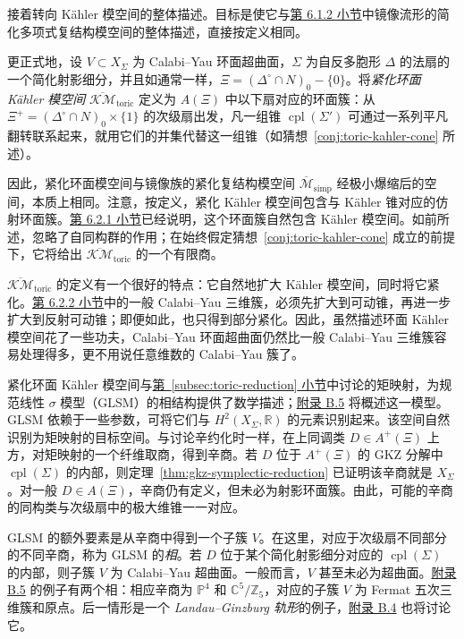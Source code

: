 接着转向 Kähler 模空间的整体描述。目标是使它与\hyperref[subsec:toric-complex-moduli]{第 6.1.2 小节}中镜像流形的简化多项式复结构模空间的整体描述，直接按定义相同。

更正式地，设 $V\subset X_\Sigma$ 为 Calabi--Yau 环面超曲面，$\Sigma$ 为自反多胞形 $\Delta$ 的法扇的一个简化射影细分，并且如通常一样，$\Xi=(\Delta^\circ\cap N)_0-\{0\}$。将\emph{紧化环面 Kähler 模空间} $\overline{\mathcal{KM}}_{\mathrm{toric}}$ 定义为 $A(\Xi)$ 中以下扇对应的环面簇：从 $\Xi^+=(\Delta^\circ\cap N)_0\times\{1\}$ 的次级扇出发，凡一组锥 $\operatorname{cpl}(\Sigma')$ 可通过一系列平凡翻转联系起来，就用它们的并集代替这一组锥（如猜想~\ref{conj:toric-kahler-cone} 所述）。

因此，紧化环面模空间与镜像族的紧化复结构模空间 $\overline{\mathcal M}_{\mathrm{simp}}$ 经极小爆缩后的空间，本质上相同。注意，按定义，紧化 Kähler 模空间包含与 Kähler 锥对应的仿射环面簇。\hyperref[subsec:large-radius-limits]{第 6.2.1 小节}已经说明，这个环面簇自然包含 Kähler 模空间。如前所述，忽略了自同构群的作用；在始终假定猜想~\ref{conj:toric-kahler-cone} 成立的前提下，它将给出 $\overline{\mathcal{KM}}_{\mathrm{toric}}$ 的一个有限商。

$\overline{\mathcal{KM}}_{\mathrm{toric}}$ 的定义有一个很好的特点：它自然地扩大 Kähler 模空间，同时将它紧化。\hyperref[subsec:threefold-kahler-moduli]{第 6.2.2 小节}中的一般 Calabi--Yau 三维簇，必须先扩大到可动锥，再进一步扩大到反射可动锥；即便如此，也只得到部分紧化。因此，虽然描述环面 Kähler 模空间花了一些功夫，Calabi--Yau 环面超曲面仍然比一般 Calabi--Yau 三维簇容易处理得多，更不用说任意维数的 Calabi--Yau 簇了。

紧化环面 Kähler 模空间与\hyperref[subsec:toric-reduction]{第~\ref*{subsec:toric-reduction} 小节}中讨论的矩映射，为规范线性 $\sigma$ 模型（GLSM）的相结构提供了数学描述；\hyperref[sec:gauged-linear-sigma-models]{附录 B.5} 将概述这一模型。GLSM 依赖于一些参数，可将它们与 $H^2(X_\Sigma,\mathbb R)$ 的元素识别起来。该空间自然识别为矩映射的目标空间。与讨论辛约化时一样，在上同调类 $D\in A^+(\Xi)$ 上方，对矩映射的一个纤维取商，得到辛商。若 $D$ 位于 $A^+(\Xi)$ 的 GKZ 分解中 $\operatorname{cpl}(\Sigma)$ 的内部，则定理~\ref{thm:gkz-symplectic-reduction} 已证明该辛商就是 $X_\Sigma$。对一般 $D\in A(\Xi)$，辛商仍有定义，但未必为射影环面簇。由此，可能的辛商的同构类与次级扇中的极大维锥一一对应。

GLSM 的额外要素是从辛商中得到一个子簇 $V$。在这里，对应于次级扇不同部分的不同辛商，称为 GLSM 的\emph{相}。若 $D$ 位于某个简化射影细分对应的 $\operatorname{cpl}(\Sigma)$ 的内部，则子簇 $V$ 为 Calabi--Yau 超曲面。一般而言，$V$ 甚至未必为超曲面。\hyperref[sec:gauged-linear-sigma-models]{附录 B.5} 的例子有两个相：相应辛商为 $\mathbb P^4$ 和 $\mathbb C^5/\mathbb Z_5$，对应的子簇 $V$ 为 Fermat 五次三维簇和原点。后一情形是一个 \emph{Landau--Ginzburg 轨形}的例子，\hyperref[sec:landau-ginzburg-models]{附录 B.4} 也将讨论它。

